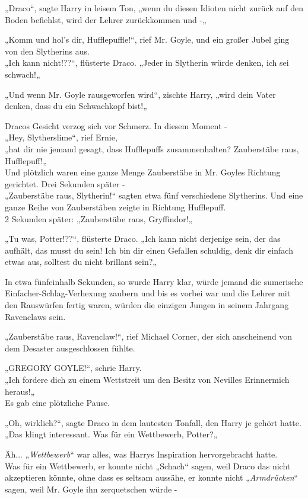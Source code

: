 {„Draco“, sagte Harry in leisem Ton, „wenn du diesen Idioten nicht zurück auf den Boden befiehlst, wird der Lehrer zurückkommen und -„

„Komm und hol's dir, Hufflepuffle!“, rief Mr. Goyle, und ein großer Jubel ging von den Slytherins aus.\\ „Ich kann nicht!??“, flüsterte Draco. „Jeder in Slytherin würde denken, ich sei schwach!„

„Und wenn Mr. Goyle rausgeworfen wird“, zischte Harry, „wird dein Vater denken, dass du ein Schwachkopf bist!„

Dracos Gesicht verzog sich vor Schmerz. In diesem Moment -\\ „Hey, Slytherslime“, rief Ernie,\\ „hat dir nie jemand gesagt, dass Hufflepuffs zusammenhalten? Zauberstäbe raus, Hufflepuff!„\\ Und plötzlich waren eine ganze Menge Zauberstäbe in Mr. Goyles Richtung gerichtet. Drei Sekunden später -\\ „Zauberstäbe raus, Slytherin!“ sagten etwa fünf verschiedene Slytherins. Und eine ganze Reihe von Zauberstäben zeigte in Richtung Hufflepuff.\\ 2 Sekunden später: „Zauberstäbe raus, Gryffindor!„

„Tu was, Potter!??“, flüsterte Draco. „Ich kann nicht derjenige sein, der das aufhält, das musst du sein! Ich bin dir einen Gefallen schuldig, denk dir einfach etwas aus, solltest du nicht brillant sein?„

In etwa fünfeinhalb Sekunden, so wurde Harry klar, würde jemand die sumerische Einfacher-Schlag-Verhexung zaubern und bis es vorbei war und die Lehrer mit den Rauswürfen fertig waren, würden die einzigen Jungen in seinem Jahrgang Ravenclaws sein.

„Zauberstäbe raus, Ravenclaw!“, rief Michael Corner, der sich anscheinend von dem Desaster ausgeschlossen fühlte.

„GREGORY GOYLE!“, schrie Harry.\\ „Ich fordere dich zu einem Wettstreit um den Besitz von Nevilles Erinnermich heraus!„\\ Es gab eine plötzliche Pause.

„Oh, wirklich?“, sagte Draco in dem lautesten Tonfall, den Harry je gehört hatte. „Das klingt interessant. Was für ein Wettbewerb, Potter?„

Äh... „\emph{Wettbewerb}“ war alles, was Harrys Inspiration hervorgebracht hatte.\\ Was für ein Wettbewerb, er konnte nicht „Schach“ sagen, weil Draco das nicht akzeptieren könnte, ohne dass es seltsam aussähe, er konnte nicht „\emph{Armdrücken}“ sagen, weil Mr. Goyle ihn zerquetschen würde -

}
